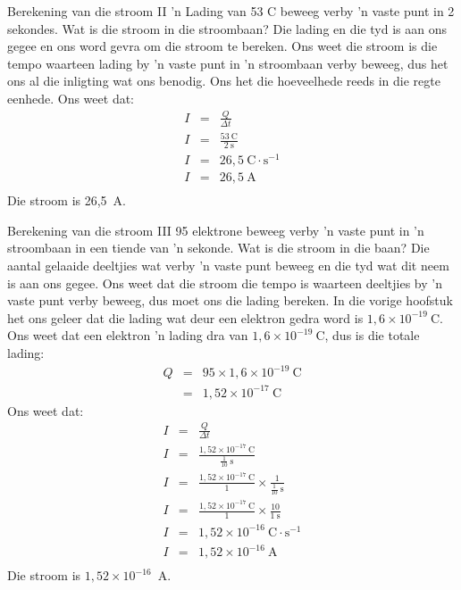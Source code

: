 \begin{wex}{Berekening van die stroom II}
{ 'n Lading van 53 C beweeg verby 'n vaste punt in 2 sekondes. Wat is die stroom
in die stroombaan?
}{%
Die lading en die tyd is aan ons gegee en ons word gevra om die stroom te
bereken. Ons weet die stroom is die tempo waarteen lading by 'n vaste punt in
 'n stroombaan verby beweeg, dus het ons al die inligting wat ons benodig. Ons
het die hoeveelhede reeds in die regte eenhede.
Ons weet dat:
\begin{eqnarray*}
I &=& \frac{Q}{\Delta t} \\
I &=& \frac{53~\text{C}}{2~\text{s}} \\
I &=& 26,5~\text{C} \cdot \text{s}^{-1} \\
I &=& 26,5~\text{A} \\
\end{eqnarray*}
Die stroom is 26,5~A.
}
\end{wex}

\begin{wex}{Berekening van die stroom III}
{95 elektrone beweeg verby 'n vaste punt in 'n stroombaan in een tiende van 'n
sekonde. Wat is die stroom in die baan?
}{%
Die aantal gelaaide deeltjies wat verby 'n vaste punt beweeg en die tyd wat
dit neem is aan ons gegee. Ons weet dat die stroom die tempo is waarteen
deeltjies by 'n vaste punt verby beweeg, dus moet ons die lading bereken. In die
vorige hoofstuk het ons geleer dat die lading wat deur een elektron gedra word
is $1,6\times10^{-19}~\text{C}$.
Ons weet dat een elektron 'n lading dra van $1,6\times10^{-19}~\text{C}$,
dus is die totale lading:
\begin{eqnarray*}
Q & = & 95 \times 1,6\times10^{-19}~\text{C} \\
& = & 1,52\times10^{-17}~\text{C} 
\end{eqnarray*}
Ons weet dat:
\begin{eqnarray*}
I &=& \frac{Q}{\Delta t} \\
I &=& \frac{1,52\times10^{-17}~\text{C}}{\frac{1}{10}~\text{s}} \\
I &=&
\frac{1,52\times10^{-17}~\text{C}}{1}\times{\frac{1}{{\frac{1}{10}~\text{s}}}}
\\
I &=& \frac{1,52\times10^{-17}~\text{C}}{1}\times\frac{10}{1~\text{s}} \\
I &=& 1,52\times10^{-16}~\text{C} \cdot \text{s}^{-1} \\
I &=& 1,52\times10^{-16}~\text{A} \\
\end{eqnarray*}
Die stroom is $1,52\times10^{-16}$~A.
}
\end{wex}


